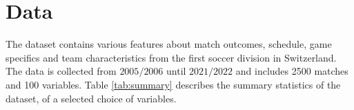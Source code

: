 \section{Data}
The dataset contains various features about match outcomes, schedule, game specifics and team characteristics from the
first soccer division in Switzerland. The data is collected from $2005/2006$ until $2021/2022$ and includes 2500
matches and 100 variables.
Table \ref{tab:summary} describes the summary statistics of the dataset, of a selected choice of variables.



